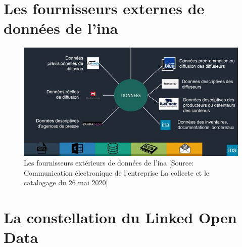 \chapter{\label{annexe_fournisseurs_exterieurs}Les fournisseurs externes de données de l'\ac{ina}}

\begin{figure}[!h]
	\centering
	\includegraphics[width=16cm]{images/enrichissement_dl.jpg}
	\caption[Les fournisseurs extérieurs de données de l'\ac{ina}]{Les fournisseurs extérieurs de données de l'\ac{ina} [Source: Communication électronique  de l'entreprise \og La collecte et le catalogage\fg{} du 26 mai 2020]}
	\label{enrichissement_dl}
\end{figure}



\chapter{\label{annexe_lod}La constellation du Linked Open Data}

